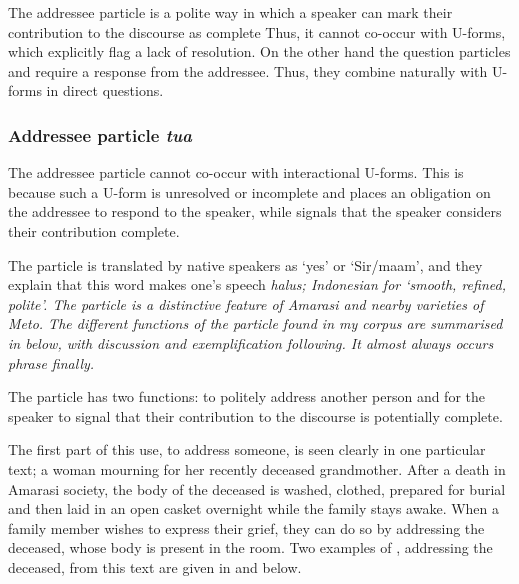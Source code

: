 The addressee particle  is a polite way
in which a speaker can mark their contribution to the discourse as complete
Thus, it cannot co-occur with U-forms, which explicitly flag a lack of resolution.
On the other hand the question particles  and 
require a response from the addressee.
Thus, they combine naturally with U-forms in direct questions.

\subsubsection{Addressee particle \it{tua}}\label{sec:AddParTua}
The addressee particle  cannot co-occur with interactional U-forms.
This is because such a U-form is unresolved or incomplete and
places an obligation on the addressee to respond to the speaker,
while  signals that the speaker considers their contribution complete.

The particle  is translated by native speakers as `yes' or `Sir/maam',
and they explain that this word makes one's speech \it{halus};
Indonesian for `smooth, refined, polite'.
The particle  is a distinctive feature
of Amarasi and nearby varieties of Meto.
The different functions of the particle 
found in my corpus are summarised in  below,
with discussion and exemplification following.
It almost always occurs phrase finally.

\begin{exe}
	\label{ex:UseTua}
		\begin{xlist}
		\end{xlist}
\end{exe}

The particle  has two functions: to politely address
another person and for the speaker to signal
that their contribution to the discourse is potentially complete.

The first part of this use, to address someone,
is seen clearly in one particular text;
a woman mourning for her recently deceased grandmother.
After a death in Amarasi society, the body of the deceased is washed, clothed,
prepared for burial and then laid in an open casket overnight while the family stays awake.
When a family member wishes to express their grief,
they can do so by addressing the deceased, whose body is present in the room.
Two examples of , addressing the deceased, from this text
are given in  and  below.

